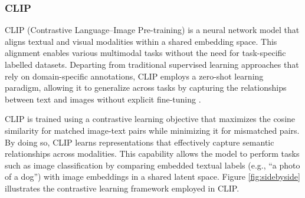 \subsubsection{CLIP}
CLIP (Contrastive Language–Image Pre-training) is a neural network model that aligns textual and visual modalities within a shared embedding space. This alignment enables various multimodal tasks without the need for task-specific labelled datasets. Departing from traditional supervised learning approaches that rely on domain-specific annotations, CLIP employs a zero-shot learning paradigm, allowing it to generalize across tasks by capturing the relationships between text and images without explicit fine-tuning \cite{radford2021learningtransferablevisualmodels}.
\newline

CLIP is trained using a contrastive learning objective that maximizes the cosine similarity for matched image-text pairs while minimizing it for mismatched pairs. By doing so, CLIP learns representations that effectively capture semantic relationships across modalities. This capability allows the model to perform tasks such as image classification by comparing embedded textual labels (e.g., “a photo of a dog”) with image embeddings in a shared latent space. Figure \ref{fig:sidebyside} illustrates the contrastive learning framework employed in CLIP.
\newline


